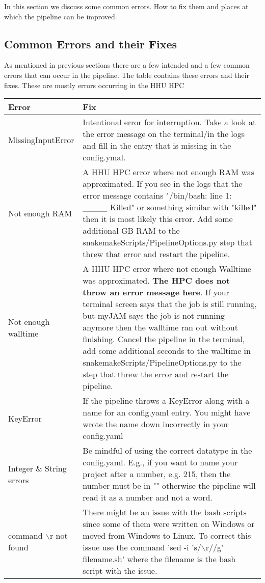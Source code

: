 In this section we discuss some common errors. How to fix them and places at which the pipeline can be improved.

\subsection{Common Errors and their Fixes}
As mentioned in previous sections there are a few intended and a few common errors that can occur in the pipeline. The table contains these errors and their fixes. These are mostly errors occurring in the HHU HPC

\begin{tabular}{p{3.5cm} | p{10cm}}
	Error & Fix\\
	\hline
	MissingInputError & Intentional error for interruption. Take a look at the error message on the terminal/in the logs and fill in the entry that is missing in the config.ymal.\\
	Not enough RAM & A HHU HPC error where not enough RAM was approximated. If you see in the logs that the error message contains "/bin/bash: line 1: \_\_\_\_ Killed" or something similar with "killed" then it is most likely this error. Add some additional GB RAM to the snakemakeScripts/PipelineOptions.py step that threw that error and restart the pipeline.\\
	Not enough walltime & A HHU HPC error where not enough Walltime was approximated. \textbf{The HPC does not throw an error message here}. If your terminal screen says that the job is still running, but myJAM says the job is not running anymore then the walltime ran out without finishing. Cancel the pipeline in the terminal, add some additional seconds to the walltime in snakemakeScripts/PipelineOptions.py to the step that threw the error and restart the pipeline.\\
	KeyError & If the pipeline throws a KeyError along with a name for an config.yaml entry. You might have wrote the name down incorrectly in your config.yaml\\
	Integer \& String errors & Be mindful of using the correct datatype in the config.yaml. E.g., if you want to name your project after a number, e.g. 215, then the number must be in "" otherwise the pipeline will read it as a number and not a word.\\
	command $\backslash$r not found & There might be an issue with the bash scripts since some of them were written on Windows or moved from Windows to Linux. To correct this issue use the command 'sed -i 's/$\backslash$r//g' filename.sh' where the filename is the bash script with the issue. 
\end{tabular}

